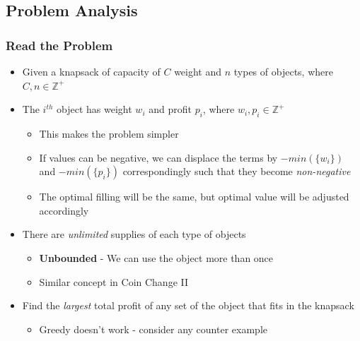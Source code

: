 \documentclass{beamer}
\begin{document}
\subsection{Problem Analysis}
\begin{frame}
	\frametitle{Read the Problem}
	\begin{itemize}
		\item Given a knapsack of capacity of \( C \) weight and \( n \) types of objects, where
	\(
		C, n \in \mathbb{Z}^+
	\)
	\item The \( i^{th} \) object has weight \( w_i \) and profit \( p_i \), where 
		\(
			w_i, p_i \in \mathbb{Z}^+
		\)
		\begin{itemize}
			\item This makes the problem simpler 
			\item If values can be negative, we can displace the terms by \( - min(\{w_i\}) \) and \( - min(\{p_i\}) \) correspondingly such that they become \emph{non-negative} 
			\item The optimal filling will be the same, but optimal value will be adjusted accordingly
		\end{itemize}	
	\item There are \emph{unlimited} supplies of each type of objects
		\begin{itemize}
			\item \textbf{Unbounded} - We can use the object more than once
			\item Similar concept in Coin Change II 
		\end{itemize}	
	\item Find the \emph{largest} total profit of any set of the object that fits in the knapsack
		\begin{itemize}
			\item Greedy doesn't work - consider any counter example
		\end{itemize}
	\end{itemize}
\end{frame}
\end{document}
